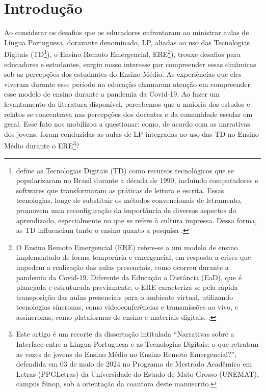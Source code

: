 \documentclass[portuguese]{textolivre}
\begin{document}
\begin{polyabstract}
\begin{english}
\begin{abstract}
\end{abstract}
\end{english}
\end{polyabstract}

\section{Introdução}\label{sec-intro}
Ao considerar os desafios que os educadores enfrentaram ao ministrar aulas de Língua Portuguesa, doravante denominado, LP, aliadas ao uso das Tecnologias Digitais (TD\footnote{\textcite{ribeiro2012} define as Tecnologias Digitais (TD) como recursos tecnológicos que se popularizaram no Brasil durante a década de 1990, incluindo computadores e softwares que transformaram as práticas de leitura e escrita. Essas tecnologias, longe de substituir os métodos convencionais de letramento, promovem uma reconfiguração da importância de diversos aspectos do aprendizado, especialmente no que se refere à cultura impressa. Dessa forma, as TD influenciam tanto o ensino quanto a pesquisa \cite{ribeiro2012}.}), o Ensino Remoto Emergencial, ERE\footnote{O Ensino Remoto Emergencial (ERE) refere-se a um modelo de ensino implementado de forma temporária e emergencial, em resposta a crises que impedem a realização das aulas presenciais, como ocorreu durante a pandemia da Covid-19. Diferente da Educação a Distância (EaD), que é planejada e estruturada previamente, o ERE caracteriza-se pela rápida transposição das aulas presenciais para o ambiente virtual, utilizando tecnologias síncronas, como videoconferências e transmissões ao vivo, e assíncronas, como plataformas de ensino e materiais digitais. \cite{dutra2025}.}), trouxe desafios para educadores e estudantes, surgiu nosso interesse por compreender essas dinâmicas sob as percepções dos estudantes do Ensino Médio. As experiências que eles viveram durante esse período na educação chamaram atenção em compreender esse modelo de ensino durante a pandemia da Covid-19. Ao fazer um levantamento da literatura disponível, percebemos que a maioria dos estudos e relatos se concentrava nas percepções dos docentes e da comunidade escolar em geral. Esse fato nos mobilizou a questionar: como, de acordo com as narrativas dos jovens, foram conduzidas as aulas de LP integradas ao uso das TD no Ensino Médio durante o ERE\footnote{Este artigo é um recorte da dissertação intitulada “Narrativas sobre a Interface entre a Língua Portuguesa e as Tecnologias Digitais: o que retratam as vozes de jovens do Ensino Médio no Ensino Remoto Emergencial?”, defendida em 03 de maio de 2024 no Programa de Mestrado Acadêmico em Letras (PPGLetras) da Universidade do Estado de Mato Grosso (UNEMAT), campus Sinop, sob a orientação da coautora deste manuscrito.}?
\end{document}
